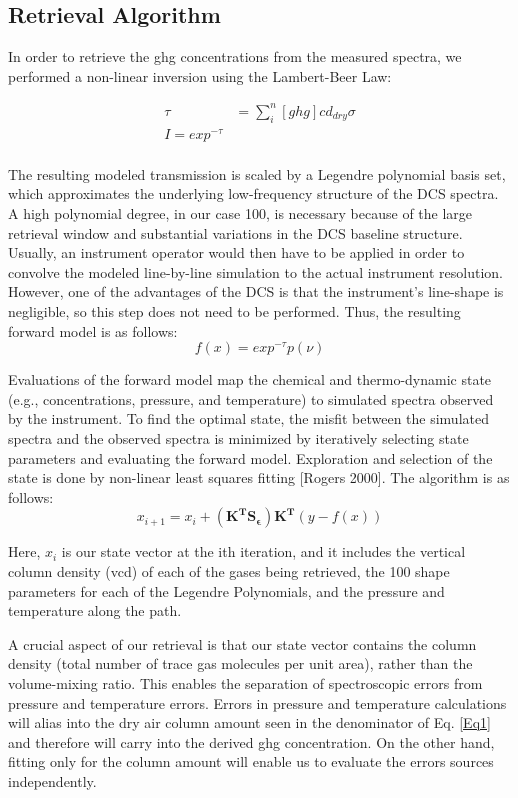 \documentclass[amt, manuscript]{copernicus}
\begin{document}
\subsection{Retrieval Algorithm }
In order to retrieve the ghg concentrations from the measured spectra, we performed a non-linear inversion using the Lambert-Beer Law:

\begin{align}
  \tau &= \sum_i^n [ghg] cd_{dry} \sigma \label{optical_depth} \\
  I = exp^{-\tau} \\
\end{align}

         
The resulting modeled transmission is scaled by a Legendre polynomial basis set, which approximates the underlying low-frequency structure of the DCS spectra. A high polynomial degree, in our case 100, is necessary because of the large retrieval window and substantial variations in the DCS baseline structure. Usually, an instrument operator would then have to be applied in order to convolve the modeled line-by-line simulation to the actual instrument resolution. However, one of the advantages of the DCS is that the instrument's line-shape is negligible, so this step does not need to be performed.  Thus, the resulting forward model is as follows:
\begin{equation}
  f(x) = exp^{-\tau} p(\nu)
\end{equation}

Evaluations of the forward model map the chemical and thermo-dynamic state (e.g., concentrations, pressure, and temperature) to simulated spectra observed by the instrument. To find the optimal state, the misfit between the simulated spectra and the observed spectra is minimized by iteratively selecting state parameters and evaluating the forward model. Exploration and selection of the state is done by non-linear least squares fitting [Rogers 2000]. The  algorithm is as follows:
\begin{equation}
  x_{i+1} = x_i + (\mathbf{K^T S_{\epsilon}}) \mathbf{K^T}(y - f(x))
\end{equation}

Here, $x_i$ is our state vector at the ith iteration, and it includes the vertical column density (vcd) of each of the gases being retrieved, the 100 shape parameters for each of the Legendre Polynomials, and the pressure and temperature along the path. 

A crucial aspect of our retrieval is that our state vector contains the column density (total number of trace gas molecules per unit area), rather than the volume-mixing ratio. This enables the separation of spectroscopic errors from pressure and temperature errors. Errors in pressure and temperature calculations will alias into the dry air column amount seen in the denominator of Eq. \ref{Eq1} and therefore will carry into the derived ghg concentration. On the other hand, fitting only for the column amount will enable us to evaluate the errors sources independently. 
\end{document}
